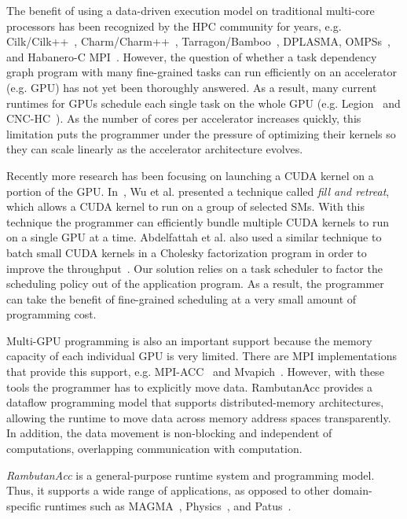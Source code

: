 The benefit of using a data-driven execution model on traditional multi-core processors has been recognized by the HPC community for years, e.g. Cilk/Cilk++~\cite{cilk,BlumofeJoKu95}, Charm/Charm++~\cite{charm++}, Tarragon/Bamboo~\cite{cicotti11:dissertation,bamboo, bamboo-LU, bambooThesis}, DPLASMA\cite{dplasma,Bosilca:2012:DAGuE}, OMPSs~\cite{ompss,nexus}, and Habanero-C MPI~\cite{Chatterjee:2013:HCMPI}.
However, the question of whether a task dependency graph program with many fine-grained tasks can run efficiently on an accelerator (e.g. GPU) has not yet been thoroughly answered.
As a result, many current runtimes for GPUs schedule each single task on the whole GPU (e.g. Legion~\cite{legion} and CNC-HC~\cite{cnc-hc}).
As the number of cores per accelerator increases quickly, this limitation puts the programmer under the pressure of optimizing their kernels so they can scale linearly as the accelerator architecture evolves.

Recently more research has been focusing on launching a CUDA kernel on a portion of the GPU.
In~\cite{fillNRetreat}, Wu et al. presented a technique called {\em fill and retreat}, which allows a CUDA kernel to run on a group of selected SMs.
With this technique the programmer can efficiently bundle multiple CUDA kernels to run on a single GPU at a time.
Abdelfattah et al. also used a similar technique to batch small CUDA kernels in a Cholesky factorization program in order to improve the throughput~\cite{batchedCholesky}.
Our solution relies on a task scheduler to factor the scheduling policy out of the application program.
As a result, the programmer can take the benefit of fine-grained scheduling at a very small amount of programming cost.

Multi-GPU programming is also an important support because the memory capacity of each individual GPU is very limited.
There are MPI implementations that provide this support, e.g. MPI-ACC~\cite{mpiacc, mpiacc1} and Mvapich~\cite{mvapich2gpu}.
However, with these tools the programmer has to explicitly move data.
RambutanAcc provides a dataflow programming model that supports distributed-memory architectures, allowing the runtime to move data across memory address spaces transparently.
In addition, the data movement is non-blocking and independent of computations, overlapping communication with computation.

{\em RambutanAcc} is a general-purpose runtime system and programming model.
Thus, it supports a wide range of applications, as opposed to other domain-specific runtimes such as MAGMA~\cite{MAGMA}, Physics~\cite{physics}, and Patus~\cite{patus}.
